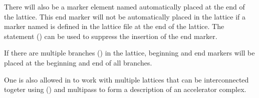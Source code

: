 There will also be a marker element named  automatically
placed at the end of the lattice. This end marker will not be
automatically placed in the lattice if a marker named  is
defined in the lattice file at the end of the lattice. The
 statement () can be used
to suppress the insertion of the end marker.

If there are multiple branches () in the lattice,
beginning and end markers will be placed at the beginning and end of
all branches.

One is also allowed in \bmad to work with multiple lattices that can
be interconnected togeter using  ()
and multipass  to form a description of an accelerator
complex.


